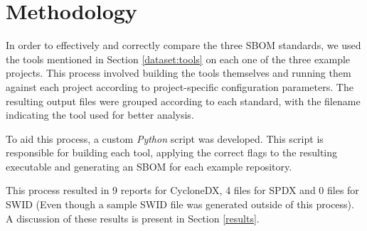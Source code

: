 \section{Methodology}

In order to effectively and correctly compare the three SBOM standards, we used the tools mentioned in Section \ref{dataset:tools} on each one of the three example projects. This process involved building the tools themselves and running them against each project according to project-specific configuration parameters. The resulting output files were grouped according to each standard, with the filename indicating the tool used for better analysis.

To aid this process, a custom \emph{Python} script was developed. This script is responsible for building each tool, applying the correct flags to the resulting executable and generating an SBOM for each example repository.

This process resulted in 9 reports for CycloneDX, 4 files for SPDX and 0 files for SWID (Even though a sample SWID file was generated outside of this process). A discussion of these results is present in Section \ref{results}.